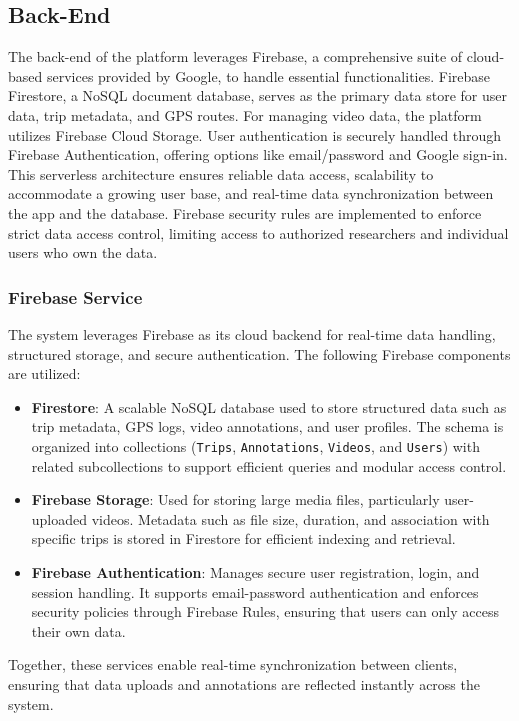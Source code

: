 \subsection{Back-End}
The back-end of the platform leverages Firebase, a comprehensive suite of cloud-based services provided by Google, to handle essential functionalities. Firebase Firestore, a NoSQL document database, serves as the primary data store for user data, trip metadata, and GPS routes.  For managing video data, the platform utilizes Firebase Cloud Storage. User authentication is securely handled through Firebase Authentication, offering options like email/password and Google sign-in. This serverless architecture ensures reliable data access, scalability to accommodate a growing user base, and real-time data synchronization between the app and the database. Firebase security rules are implemented to enforce strict data access control, limiting access to authorized researchers and individual users who own the data.

\subsubsection{Firebase Service}
The system leverages Firebase as its cloud backend for real-time data handling, structured storage, and secure authentication. The following Firebase components are utilized:
\begin{itemize}  %
    \item \textbf{Firestore}: A scalable NoSQL database used to store structured data such as trip metadata, GPS logs, video annotations, and user profiles. The schema is organized into collections (\texttt{Trips}, \texttt{Annotations}, \texttt{Videos}, and \texttt{Users}) with related subcollections to support efficient queries and modular access control.
    \item \textbf{Firebase Storage}: Used for storing large media files, particularly user-uploaded videos. Metadata such as file size, duration, and association with specific trips is stored in Firestore for efficient indexing and retrieval.
    \item \textbf{Firebase Authentication}: Manages secure user registration, login, and session handling. It supports email-password authentication and enforces security policies through Firebase Rules, ensuring that users can only access their own data.
\end{itemize}
Together, these services enable real-time synchronization between clients, ensuring that data uploads and annotations are reflected instantly across the system.

